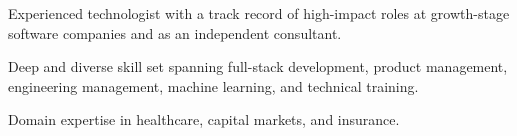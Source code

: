 

\begin{cvparagraph}

Experienced technologist with a track record of high-impact roles at growth-stage software companies
and as an independent consultant.

Deep and diverse skill set spanning full-stack development, product management, engineering management, machine learning, and technical training.

Domain expertise in healthcare, capital markets, and insurance.
\end{cvparagraph}
